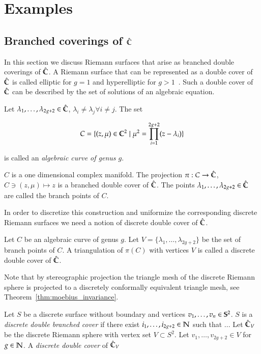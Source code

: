 \documentclass[Thesis.tex]{subfiles}
\begin{document}
\chapter{Examples}
\label{chp:conformal_examples}

\section{Branched coverings of $\Chat$}
In this section we discuss Riemann surfaces that arise as branched double coverings of $\hat{\C}$. A Riemann surface that can be represented as a double cover of $\Chat$ is called elliptic for $g=1$ and hyperelliptic for $g>1$~\cite[p.~235]{Jost2007}. Such a double cover of $\Chat$ can be described by the
set of solutions of an algebraic equation.

\begin{definition}
Let $\lambda_1,\ldots,\lambda_{2g+2}\in \hat{\C}$, $\lambda_i\neq \lambda_j \forall i\neq j$. The
set

\begin{equation}
\label{eq:branched_cover}
C=\{(z, \mu)\in\C^2 \mid \mu^2 = \prod_{i=1}^{2g+2}(z-\lambda_i)\}
\end{equation}

is called an \emph{algebraic curve of genus $g$}.
\end{definition}

$C$ is a one dimensional complex manifold. The projection $\pi:C\to\Chat$, $C\ni(z,\mu)\mapsto z$ is a branched double cover of $\Chat$. The points $\lambda_1,\ldots,\lambda_{2g+2}\in \hat{\C}$ are called
the branch points of $C$.

In order to discretize this construction and uniformize the corresponding discrete Riemann surfaces
we need a notion of discrete double cover of $\Chat$.

\begin{definition}
Let $C$ be an algebraic curve of genus $g$. Let $V = \{\lambda_1,\ldots,\lambda_{2g+2}\}$ be the set of
branch points of $C$. A triangulation of $\pi(C)$ with vertices $V$ is called a discrete double cover of 
$\Chat$.
\end{definition}

Note that by stereographic projection the triangle mesh of the discrete Riemann sphere is projected to a
discretely conformally equivalent triangle mesh, see Theorem~\ref{thm:moebius_invariance}.

\begin{definition}
Let $S$ be a discrete surface without boundary and vertices $v_1,\ldots,v_n\in\S^2$. $S$ is a \emph{discrete double branched cover} if there exist $i_1,\ldots, i_{2g+2}\in \N$ such that ... 
Let $\Chat_V$ be the discrete Riemann sphere with vertex set $V\subset S^2$. Let $v_1,
\ldots,v_{2g+2} \in V$ for $g\in \N$. A \emph{discrete double cover} of $\Chat_V$ 
\end{definition}
\end{document}
